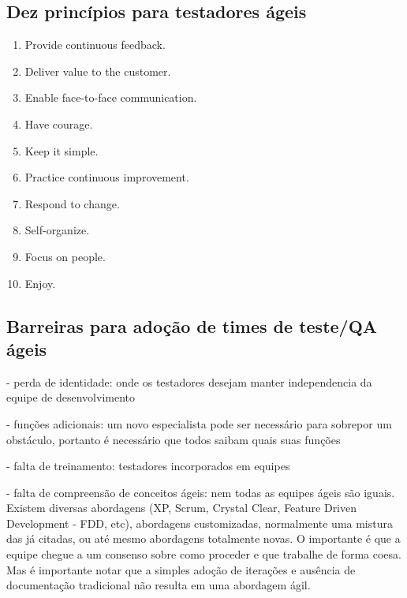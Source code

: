 \documentclass[
	12pt,				%
	openright,			%
	oneside,			%
	a4paper,			%
	english,			%
	brazil,				%
	]{abntex2}
\begin{document}
\subsection{Dez princípios para testadores ágeis}
\begin{enumerate}
    \item Provide continuous feedback.
    \item Deliver value to the customer.
    \item Enable face-to-face communication.
    \item Have courage.
    \item Keep it simple.
    \item Practice continuous improvement.
    \item Respond to change.
    \item Self-organize.
    \item Focus on people.
    \item Enjoy.
\end{enumerate}

\subsection{Barreiras para adoção de times de teste/QA ágeis}
- perda de identidade: onde os testadores desejam manter independencia da equipe de desenvolvimento

- funções adicionais: um novo especialista pode ser necessário para sobrepor um obstáculo, portanto é necessário que todos saibam quais suas funções %

- falta de treinamento: testadores incorporados em equipes 

- falta de compreensão de conceitos ágeis: nem todas as equipes ágeis são iguais. Existem diversas abordagens (XP, Scrum, Crystal Clear, Feature Driven Development - FDD, etc), abordagens customizadas, normalmente uma mistura das já citadas, ou até mesmo abordagens totalmente novas. O importante é que a equipe chegue a um consenso sobre como proceder e que trabalhe de forma coesa. Mas é importante notar que a simples adoção de iterações e ausência de documentação tradicional não resulta em uma abordagem ágil. %
\end{document}
